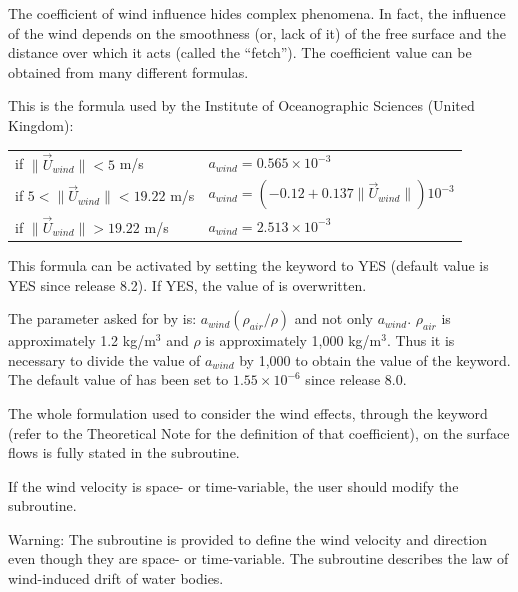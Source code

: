 The coefficient of wind influence hides complex phenomena. In fact, the
influence of the wind depends on the smoothness (or, lack of it) of the free
surface and the distance over which it acts (called the ``fetch''). The
coefficient value can be obtained from many different formulas.

This is the formula used by the Institute of Oceanographic Sciences (United
Kingdom):

\begin{tabular}{ll}
if $\| \vec{U}_{wind} \| < 5$ m/s & $a_{wind}  = 0.565 \times 10^{-3}$ \\
if $5 < \| \vec{U}_{wind} \| < 19.22$ m/s &
 $a_{wind} = (- 0.12 + 0.137 \| \vec{U}_{wind} \| ) 10^{-3}$ \\
if $\| \vec{U}_{wind} \| > 19.22$ m/s & $a_{wind} = 2.513 \times 10^{-3}$ \\
\end{tabular}

This formula can be activated by setting the keyword
 to YES
(default value is YES since release 8.2).
If YES, the value of  is overwritten.

The parameter  asked for by 
is: $a_{wind} (\rho_{air} / \rho)$ and not only $a_{wind}$.
$\rho_{air}$ is approximately 1.2 kg/m$^3$ and $\rho$
is approximately 1,000 kg/m$^3$. Thus it is necessary to divide the value of
$a_{wind}$ by 1,000 to obtain the value of the  keyword.
The default value of  has been set to
$1.55 \times 10^{-6}$ since release 8.0.

The whole formulation used to consider the wind effects, through the keyword
 (refer to the Theoretical Note for the
definition of that coefficient), on the surface flows is fully stated in the
 subroutine.

If the wind velocity is space- or time-variable, the user should modify the
 subroutine.

\begin{WarningBlock}{Warning:}
The  subroutine is provided to define the wind velocity and
direction even though they are space- or time-variable.
The  subroutine describes the law of wind-induced drift
of water bodies.
\end{WarningBlock}

